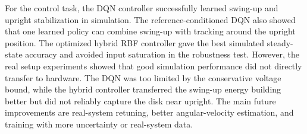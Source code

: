 \documentclass[conference]{IEEEtran}
\begin{document}
For the control task, the DQN controller successfully learned swing-up and
upright stabilization in simulation. The reference-conditioned DQN also showed
that one learned policy can combine swing-up with tracking around the upright
position. The optimized hybrid RBF controller gave the best simulated
steady-state accuracy and avoided input saturation in the robustness test.
However, the real setup experiments showed that good simulation performance did
not directly transfer to hardware. The DQN was too limited by the conservative
voltage bound, while the hybrid controller transferred the swing-up energy
building better but did not reliably capture the disk near upright. The main
future improvements are real-system retuning, better angular-velocity
estimation, and training with more uncertainty or real-system data.



\end{document}
